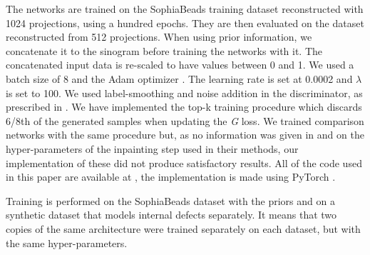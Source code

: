 \documentclass[../main.tex]{subfiles}
\begin{document}
The networks are trained on the SophiaBeads training dataset reconstructed with 1024 projections, using a hundred epochs. They are then evaluated on the dataset reconstructed from 512 projections. When using prior information, we concatenate it to the sinogram before training the networks with it. The concatenated input data is re-scaled to have values between 0 and 1. We used a batch size of 8 and the Adam optimizer \cite{kingma2014Adam}. The learning rate is set at 0.0002 and $\lambda$ is set to 100. We used label-smoothing and noise addition in the discriminator, as prescribed in \cite{goodfellow2016nips}. We have implemented the top-k \cite{sinha2020top} training procedure which discards 6/8th of the generated samples when updating the \textit{G} loss. We trained comparison networks with the same procedure but, as no information was given in \cite{yoo2019sinogram} and \cite{yeh2016semantic} on the hyper-parameters of the inpainting step used in their methods, our implementation of these did not produce satisfactory results. All of the code used in this paper are available at \cite{valat2021codes}, the implementation is made using PyTorch \cite{paszke2019pytorch}.

Training is performed on the SophiaBeads dataset with the priors and on a synthetic dataset that models internal defects separately. It means that two copies of the same architecture were trained separately on each dataset, but with the same hyper-parameters.
\end{document}
